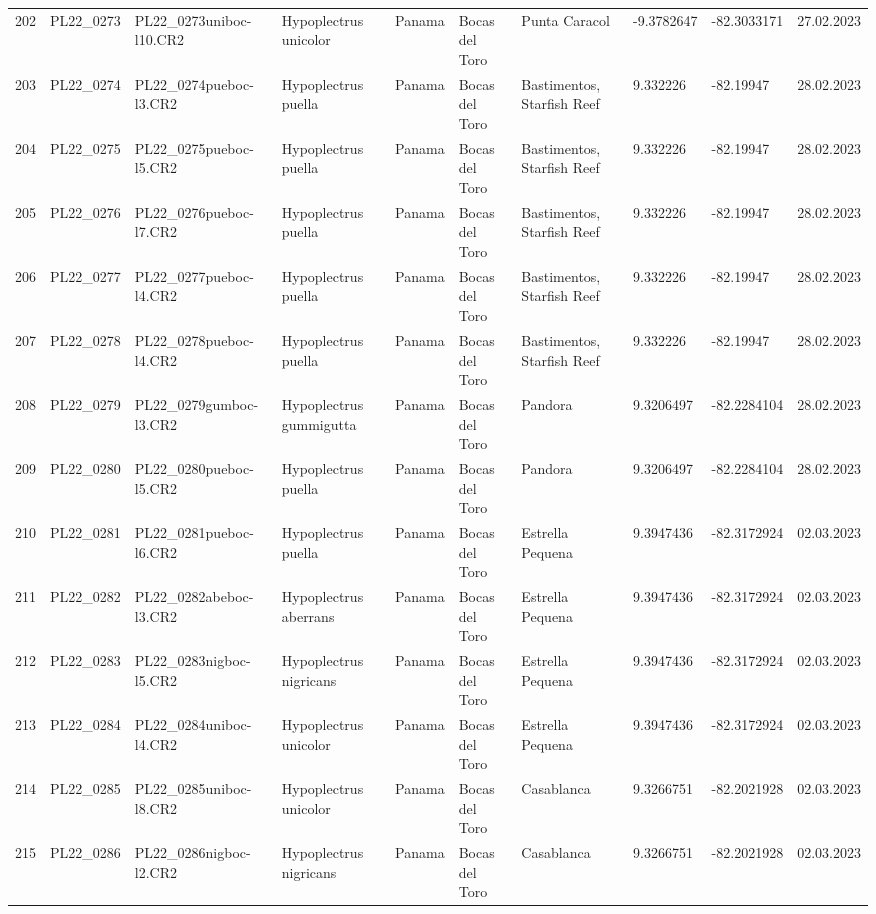 \begin{table}[ht]
\begin{tabular}{rlllllllll}
  202 & PL22\_0273 & PL22\_0273uniboc-l10.CR2 & Hypoplectrus unicolor & Panama & Bocas del Toro & Punta Caracol & -9.3782647 & -82.3033171 & 27.02.2023 \\ 
  203 & PL22\_0274 & PL22\_0274pueboc-l3.CR2 & Hypoplectrus puella & Panama & Bocas del Toro & Bastimentos, Starfish Reef & 9.332226 & -82.19947 & 28.02.2023 \\ 
  204 & PL22\_0275 & PL22\_0275pueboc-l5.CR2 & Hypoplectrus puella & Panama & Bocas del Toro & Bastimentos, Starfish Reef & 9.332226 & -82.19947 & 28.02.2023 \\ 
  205 & PL22\_0276 & PL22\_0276pueboc-l7.CR2 & Hypoplectrus puella & Panama & Bocas del Toro & Bastimentos, Starfish Reef & 9.332226 & -82.19947 & 28.02.2023 \\ 
  206 & PL22\_0277 & PL22\_0277pueboc-l4.CR2 & Hypoplectrus puella & Panama & Bocas del Toro & Bastimentos, Starfish Reef & 9.332226 & -82.19947 & 28.02.2023 \\ 
  207 & PL22\_0278 & PL22\_0278pueboc-l4.CR2 & Hypoplectrus puella & Panama & Bocas del Toro & Bastimentos, Starfish Reef & 9.332226 & -82.19947 & 28.02.2023 \\ 
  208 & PL22\_0279 & PL22\_0279gumboc-l3.CR2 & Hypoplectrus gummigutta & Panama & Bocas del Toro & Pandora & 9.3206497 & -82.2284104 & 28.02.2023 \\ 
  209 & PL22\_0280 & PL22\_0280pueboc-l5.CR2 & Hypoplectrus puella & Panama & Bocas del Toro & Pandora & 9.3206497 & -82.2284104 & 28.02.2023 \\ 
  210 & PL22\_0281 & PL22\_0281pueboc-l6.CR2 & Hypoplectrus puella & Panama & Bocas del Toro & Estrella Pequena & 9.3947436 & -82.3172924 & 02.03.2023 \\ 
  211 & PL22\_0282 & PL22\_0282abeboc-l3.CR2 & Hypoplectrus aberrans & Panama & Bocas del Toro & Estrella Pequena & 9.3947436 & -82.3172924 & 02.03.2023 \\ 
  212 & PL22\_0283 & PL22\_0283nigboc-l5.CR2 & Hypoplectrus nigricans  & Panama & Bocas del Toro & Estrella Pequena & 9.3947436 & -82.3172924 & 02.03.2023 \\ 
  213 & PL22\_0284 & PL22\_0284uniboc-l4.CR2 & Hypoplectrus unicolor & Panama & Bocas del Toro & Estrella Pequena & 9.3947436 & -82.3172924 & 02.03.2023 \\ 
  214 & PL22\_0285 & PL22\_0285uniboc-l8.CR2 & Hypoplectrus unicolor & Panama & Bocas del Toro & Casablanca & 9.3266751 & -82.2021928 & 02.03.2023 \\ 
  215 & PL22\_0286 & PL22\_0286nigboc-l2.CR2 & Hypoplectrus nigricans  & Panama & Bocas del Toro & Casablanca & 9.3266751 & -82.2021928 & 02.03.2023 \\ 

\end{tabular}
\end{table}
